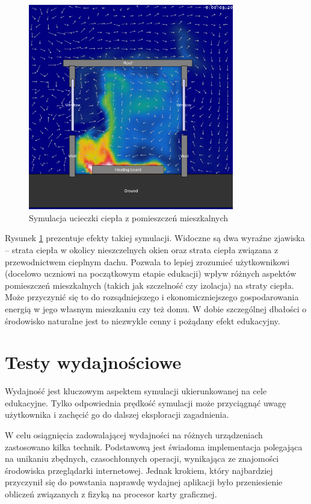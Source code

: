\begin{figure}[!h]
\centering
\includegraphics[width=0.8\textwidth]{img/physics/wind}
\caption{Symulacja ucieczki ciepła z pomieszczeń mieszkalnych}
\label{fig:wind}
\end{figure}

Rysunek \ref{fig:wind} prezentuje efekty takiej symulacji. Widoczne są dwa
wyraźne zjawiska -- strata ciepła w okolicy nieszczelnych okien oraz strata
ciepła związana z przewodnictwem cieplnym dachu. Pozwala to lepiej zrozumieć
użytkownikowi (docelowo uczniowi na początkowym etapie edukacji) wpływ różnych
aspektów pomieszczeń mieszkalnych (takich jak szczelność czy izolacja) na straty
ciepła. Może przyczynić się to do rozsądniejszego i ekonomiczniejszego
gospodarowania energią w jego własnym mieszkaniu czy też domu. W dobie
szczególnej dbałości o środowisko naturalne jest to niezwykle cenny i pożądany
efekt edukacyjny.

\section{Testy wydajnościowe}

Wydajność jest kluczowym aspektem symulacji ukierunkowanej na cele edukacyjne.
Tylko odpowiednia prędkość symulacji może przyciągnąć uwagę użytkownika i
zachęcić go do dalszej eksploracji zagadnienia.

W celu osiągnięcia zadowalającej wydajności na różnych urządzeniach zastosowano
kilka technik. Podstawową jest świadoma implementacja polegająca na unikaniu
zbędnych, czasochłonnych operacji, wynikająca ze znajomości środowiska
przeglądarki internetowej. Jednak krokiem, który najbardziej przyczynił się do
powstania naprawdę wydajnej aplikacji było przeniesienie obliczeń związanych
z fizyką na procesor karty graficznej.

